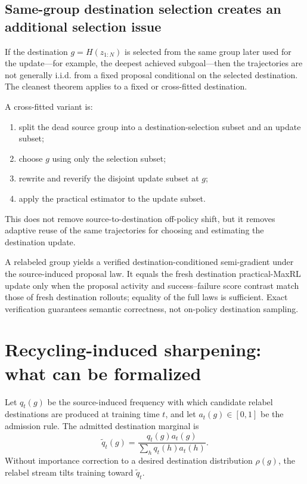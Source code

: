 \documentclass[11pt]{article}
\theoremstyle{definition}
\theoremstyle{remark}
\begin{document}
\subsection{Same-group destination selection creates an additional selection issue}

If the destination $g=H(z_{1:N})$ is selected from the same group later used for the update---for example, the deepest achieved subgoal---then the trajectories are not generally i.i.d. from a fixed proposal conditional on the selected destination. The cleanest theorem applies to a fixed or cross-fitted destination.

A cross-fitted variant is:

\begin{enumerate}[leftmargin=2em]
\item split the dead source group into a destination-selection subset and an update subset;
\item choose $g$ using only the selection subset;
\item rewrite and reverify the disjoint update subset at $g$;
\item apply the practical estimator to the update subset.
\end{enumerate}

This does not remove source-to-destination off-policy shift, but it removes adaptive reuse of the same trajectories for choosing and estimating the destination update.

\begin{rewritebox}[title={\textbf{Recommended hindsight proposition}}]
A relabeled group yields a verified destination-conditioned semi-gradient under the source-induced proposal law. It equals the fresh destination practical-MaxRL update only when the proposal activity and success--failure score contrast match those of fresh destination rollouts; equality of the full laws is sufficient. Exact verification guarantees semantic correctness, not on-policy destination sampling.
\end{rewritebox}

\section{Recycling-induced sharpening: what can be formalized}

Let $q_t(g)$ be the source-induced frequency with which candidate relabel destinations are produced at training time $t$, and let $a_t(g)\in[0,1]$ be the admission rule. The admitted destination marginal is
\begin{equation}
\widetilde q_t(g)
=\frac{q_t(g)a_t(g)}{\sum_h q_t(h)a_t(h)}.
\label{eq:destination-marginal}
\end{equation}
Without importance correction to a desired destination distribution $\rho(g)$, the relabel stream tilts training toward $\widetilde q_t$.
\end{document}
